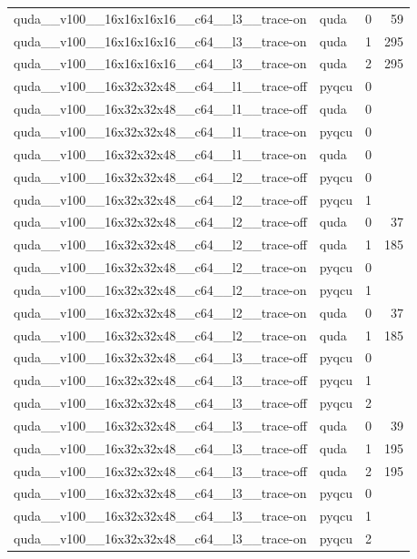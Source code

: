 \begin{table}[htbp]
\begin{tabular}{@{}llrr@{}}
quda\_\_v100\_\_16x16x16x16\_\_c64\_\_l3\_\_trace-on & quda & 0 & 59 \\
quda\_\_v100\_\_16x16x16x16\_\_c64\_\_l3\_\_trace-on & quda & 1 & 295 \\
quda\_\_v100\_\_16x16x16x16\_\_c64\_\_l3\_\_trace-on & quda & 2 & 295 \\
quda\_\_v100\_\_16x32x32x48\_\_c64\_\_l1\_\_trace-off & pyqcu & 0 &  \\
quda\_\_v100\_\_16x32x32x48\_\_c64\_\_l1\_\_trace-off & quda & 0 &  \\
quda\_\_v100\_\_16x32x32x48\_\_c64\_\_l1\_\_trace-on & pyqcu & 0 &  \\
quda\_\_v100\_\_16x32x32x48\_\_c64\_\_l1\_\_trace-on & quda & 0 &  \\
quda\_\_v100\_\_16x32x32x48\_\_c64\_\_l2\_\_trace-off & pyqcu & 0 &  \\
quda\_\_v100\_\_16x32x32x48\_\_c64\_\_l2\_\_trace-off & pyqcu & 1 &  \\
quda\_\_v100\_\_16x32x32x48\_\_c64\_\_l2\_\_trace-off & quda & 0 & 37 \\
quda\_\_v100\_\_16x32x32x48\_\_c64\_\_l2\_\_trace-off & quda & 1 & 185 \\
quda\_\_v100\_\_16x32x32x48\_\_c64\_\_l2\_\_trace-on & pyqcu & 0 &  \\
quda\_\_v100\_\_16x32x32x48\_\_c64\_\_l2\_\_trace-on & pyqcu & 1 &  \\
quda\_\_v100\_\_16x32x32x48\_\_c64\_\_l2\_\_trace-on & quda & 0 & 37 \\
quda\_\_v100\_\_16x32x32x48\_\_c64\_\_l2\_\_trace-on & quda & 1 & 185 \\
quda\_\_v100\_\_16x32x32x48\_\_c64\_\_l3\_\_trace-off & pyqcu & 0 &  \\
quda\_\_v100\_\_16x32x32x48\_\_c64\_\_l3\_\_trace-off & pyqcu & 1 &  \\
quda\_\_v100\_\_16x32x32x48\_\_c64\_\_l3\_\_trace-off & pyqcu & 2 &  \\
quda\_\_v100\_\_16x32x32x48\_\_c64\_\_l3\_\_trace-off & quda & 0 & 39 \\
quda\_\_v100\_\_16x32x32x48\_\_c64\_\_l3\_\_trace-off & quda & 1 & 195 \\
quda\_\_v100\_\_16x32x32x48\_\_c64\_\_l3\_\_trace-off & quda & 2 & 195 \\
quda\_\_v100\_\_16x32x32x48\_\_c64\_\_l3\_\_trace-on & pyqcu & 0 &  \\
quda\_\_v100\_\_16x32x32x48\_\_c64\_\_l3\_\_trace-on & pyqcu & 1 &  \\
quda\_\_v100\_\_16x32x32x48\_\_c64\_\_l3\_\_trace-on & pyqcu & 2 &  \\

\end{tabular}
\end{table}
